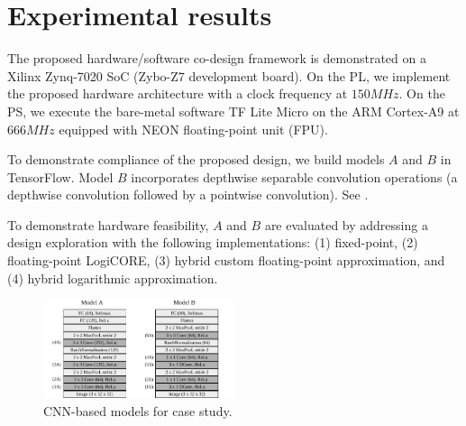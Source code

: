 \section{Experimental results}
\label{sec:experimental_results}
The proposed hardware/software co-design framework is demonstrated on a Xilinx Zynq-7020 SoC (Zybo-Z7 development board). On the PL, we implement the proposed hardware architecture with a clock frequency at $150 MHz$. On the PS, we execute the bare-metal software TF Lite Micro on the ARM Cortex-A9 at $666MHz$ equipped with NEON floating-point unit (FPU)\cite{xilinx2015zynq}.

To demonstrate compliance of the proposed design, we build models $A$ and $B$ in TensorFlow. Model $B$ incorporates depthwise separable convolution operations (a depthwise convolution followed by
a pointwise convolution). See .

To demonstrate hardware feasibility, $A$ and $B$ are evaluated by addressing a design exploration with the following implementations:
(1) fixed-point, (2) floating-point LogiCORE, (3) hybrid custom floating-point approximation, and (4) hybrid logarithmic approximation.


\begin{figure}[t!]
	\centering
	\includegraphics[width=0.5\textwidth]{../figures/models.pdf}
	\caption{CNN-based models for case study.}
	\label{fig:models}
\end{figure}

